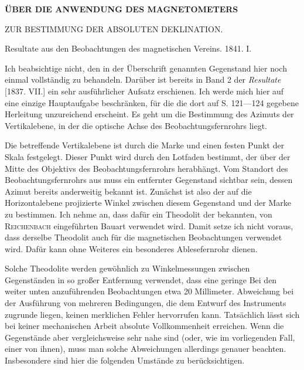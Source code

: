 \clearpage
{}
\begin{center}
{\Large\bfseries ÜBER DIE ANWENDUNG DES MAGNETOMETERS\par\medskip ZUR BESTIMMUNG DER ABSOLUTEN DEKLINATION.}
\par\bigskip
Resultate aus den Beobachtungen des magnetischen Vereins. 1841. I.
\end{center}
Ich beabsichtige nicht, den in der Überschrift genannten Gegenstand hier noch einmal vollständig zu behandeln. Darüber ist bereits in Band 2 der \textit{Resultate} [1837. VII.] ein sehr ausführlicher Aufsatz erschienen. Ich werde mich hier auf eine einzige Hauptaufgabe beschränken, für die die dort auf S. 121—124 gegebene Herleitung unzureichend erscheint. Es geht um die Bestimmung des Azimuts der Vertikalebene, in der die optische Achse des Beobachtungsfernrohrs liegt.

Die betreffende Vertikalebene ist durch die Marke und einen festen Punkt der Skala festgelegt. Dieser Punkt wird durch den Lotfaden bestimmt, der über der Mitte des Objektivs des Beobachtungsfernrohrs herabhängt. Vom Standort des Beobachtungsfernrohrs aus muss ein entfernter Gegenstand sichtbar sein, dessen Azimut bereits anderweitig bekannt ist. Zunächst ist also der auf die Horizontalebene projizierte Winkel zwischen diesem Gegenstand und der Marke zu bestimmen. Ich nehme an, dass dafür ein Theodolit der bekannten, von \textsc{Reichenbach} eingeführten Bauart verwendet wird. Damit setze ich nicht voraus, dass derselbe Theodolit auch für die magnetischen Beobachtungen verwendet wird. Dafür kann ohne Weiteres ein besonderes Ablesefernrohr dienen.

Solche Theodolite werden gewöhnlich zu Winkel\-messungen zwischen Gegenständen in so großer Entfernung verwendet, dass eine geringe
\expandafter\def\csname HistoricalNoteText443\endcsname{Bei den weiter unten anzuführenden Beobachtungen etwa 20 Millimeter.}%
Abweichung bei der Ausführung von mehreren Bedingungen, die dem Entwurf des Instruments zugrunde liegen, keinen merklichen Fehler hervorrufen kann. Tatsächlich lässt sich bei keiner mechanischen Arbeit absolute Vollkommenheit erreichen. Wenn die Gegenstände aber vergleichsweise sehr nahe sind (oder, wie im vorliegenden Fall, einer von ihnen), muss man solche Abweichungen allerdings genauer beachten. Insbesondere sind hier die folgenden Umstände zu berücksichtigen.

